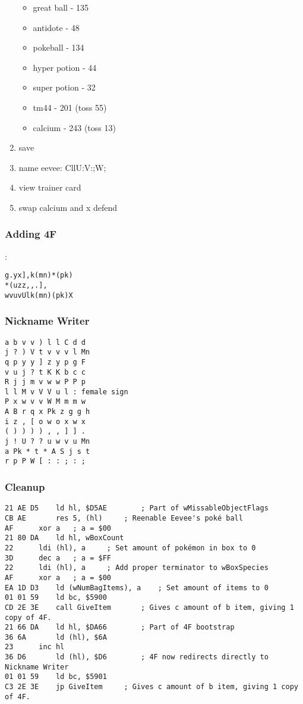 \documentclass[../main.tex]{subfiles}
\begin{document}
\begin{enumerate}
\begin{itemize}
            \item great ball - 135
            \item antidote - 48
            \item pokeball - 134
            \item hyper potion - 44
            \item super potion - 32
            \item tm44 - 201 (toss 55)
            \item calcium - 243 (toss 13)
        \end{itemize}
        \item save
        \item name eevee: CllU:V:;W;
        \item view trainer card
        \item swap calcium and x defend
    \end{enumerate}

    \subsubsection{Adding 4F}:
    \begin{verbatim}
g.yx],k(mn)*(pk)
*(uzz,,.],
wvuvUlk(mn)(pk)X
    \end{verbatim}

    \subsubsection{Nickname Writer}
    \begin{verbatim}
a b v v ) l l C d d
j ? ) V t v v v l Mn
q p y y ] z y p g F
v u j ? t K K b c c
R j j m v w w P P p
l l M v V V u l : female sign
P x w v v W M m m w
A B r q x Pk z g g h
i z , [ o w o x w x
( ) ) ) ) , , ] ] .
j ! U ? ? u w v u Mn
a Pk * t * A S j s t
r p P W [ : : ; : ;        
    \end{verbatim}

    \subsubsection{Cleanup}
    \begin{verbatim}
21 AE D5	ld hl, $D5AE		; Part of wMissableObjectFlags
CB AE		res 5, (hl)		; Reenable Eevee's poké ball
AF		xor a	; a = $00
21 80 DA	ld hl, wBoxCount
22		ldi (hl), a		; Set amount of pokémon in box to 0
3D		dec a	; a = $FF
22		ldi (hl), a		; Add proper terminator to wBoxSpecies
AF		xor a	; a = $00
EA 1D D3	ld (wNumBagItems), a	; Set amount of items to 0
01 01 59	ld bc, $5900
CD 2E 3E	call GiveItem		; Gives c amount of b item, giving 1 copy of 4F.
21 66 DA	ld hl, $DA66		; Part of 4F bootstrap
36 6A		ld (hl), $6A
23		inc hl
36 D6		ld (hl), $D6		; 4F now redirects directly to Nickname Writer
01 01 59	ld bc, $5901
C3 2E 3E	jp GiveItem		; Gives c amount of b item, giving 1 copy of 4F.
    \end{verbatim}
\end{document}
